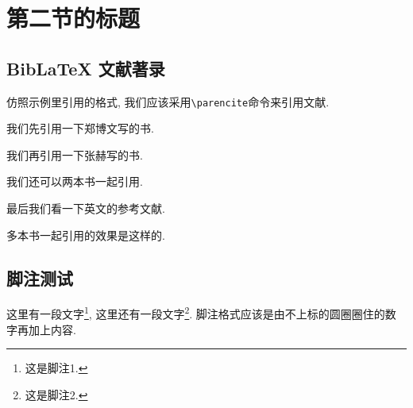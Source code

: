 
\section{第二节的标题}

\zhlipsum[1]

\subsection{BibLaTeX 文献著录}

\nocite{*}

仿照示例里引用的格式, 我们应该采用\verb|\parencite|命令来引用文献.

我们先引用一下郑博文写的书\parencite{rudin1976principleschinese3}.

我们再引用一下张赫写的书\parencite{rudin1976principleschinese}.

我们还可以两本书一起引用\parencite{rudin1976principleschinese,rudin1976principleschinese3}.

最后我们看一下英文的参考文献\parencite{rudin1976principles}.

多本书一起引用的效果是这样的\parencite{rudin1976principleschinese,rudin1976principleschinese3, rudin1976principles, rudin1976principleschinese2}.

\zhlipsum[1]

\subsection{脚注测试}

这里有一段文字\footnote{这是脚注1.}, 这里还有一段文字\footnote{这是脚注2.}. 脚注格式应该是由不上标的圆圈圈住的数字再加上内容.

\zhlipsum
